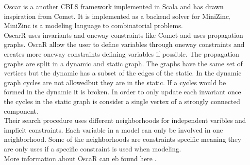 Oscar is a another CBLS framework implemented in Scala and has drawn inspiration from Comet. It is implemented as a 
backend solver for MiniZinc, MiniZinc is a modeling language to combinatorial problems.  \\ 
OscarR uses invariants and oneway constraints like Comet and uses propagation graphs. OscaR allow the user to define 
variables through oneway constraints and creates more oneway constraints defining variables if possible. The 
propagation graphs are split in a dynamic and static graph. The graphs have the same set of vertices but the 
dynamic has a subset of the edges of the static. In the dynamic graph cycles are not allowedbut they are in 
the static. If a cycles would be formed in the dynamic it is broken. In order to only update each invariant 
once the cycles in the static graph is consider a single vertex of a strongly connected component. \\ 
Their search procedure uses different neighborhoods for independent varibles and implicit constraints. Each variable in 
a model can only be involved in one neighborhood. Some of the neighborhoods are constraints specific meaning they 
are only uses if a specific constraint is used when modeling. \\ 
More information about OscaR can eb found here \cite{oscar} \cite{oscar2}. 